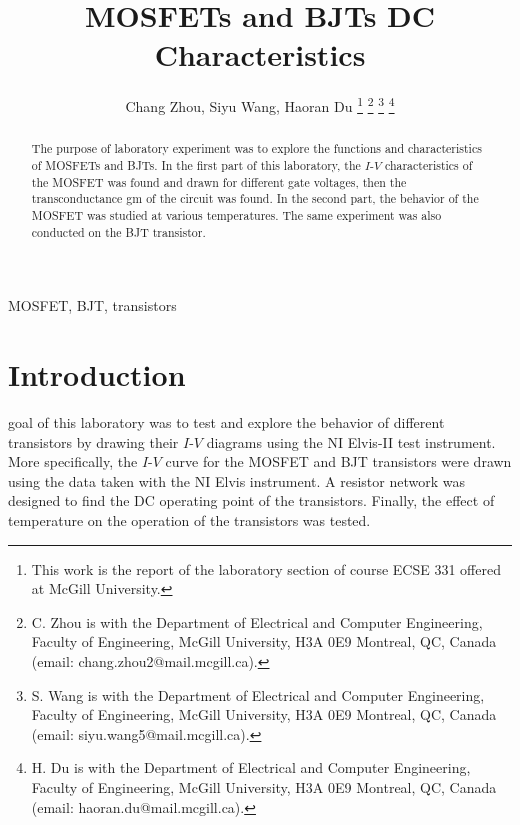\documentclass[journal]{IEEEtran}
\begin{document}
\begin{titlepage}

\end{titlepage}
\title{MOSFETs and BJTs DC Characteristics}
\author{Chang Zhou, Siyu Wang, Haoran Du
\thanks{This work is the report of the laboratory section of course ECSE 331 offered at McGill University.}
\thanks{C. Zhou is with the Department of Electrical and Computer
Engineering, Faculty of Engineering, McGill University, H3A 0E9 Montreal, QC, Canada
(email: chang.zhou2@mail.mcgill.ca).}
\thanks{S. Wang is with the Department of Electrical and Computer
Engineering, Faculty of Engineering, McGill University, H3A 0E9 Montreal, QC, Canada
(email: siyu.wang5@mail.mcgill.ca).}
\thanks{H. Du is with the Department of Electrical and Computer
Engineering, Faculty of Engineering, McGill University, H3A 0E9 Montreal, QC, Canada
(email: haoran.du@mail.mcgill.ca).}}

\maketitle

\begin{abstract}
  The purpose of laboratory experiment was to explore the functions
  and characteristics of MOSFETs and BJTs. In the first part of this laboratory,
  the $I$-$V$ characteristics of the MOSFET was found and drawn for different gate voltages,
  then the transconductance gm of the circuit was found. In the second part,
  the behavior of the MOSFET was studied at various temperatures.
  The same experiment was also conducted on the BJT transistor.
\end{abstract}

\begin{IEEEkeywords}
  MOSFET, BJT, transistors
\end{IEEEkeywords}

\section{Introduction}

 goal of this laboratory was to test and explore the behavior of
 different transistors by drawing their $I$-$V$ diagrams using the NI Elvis-II test instrument.
 More specifically, the $I$-$V$ curve for the MOSFET and BJT transistors were drawn
 using the data taken with the NI Elvis instrument. A resistor network was designed
 to find the DC operating point of the transistors.
 Finally, the effect of temperature on the operation of the transistors was tested.
\end{document}
